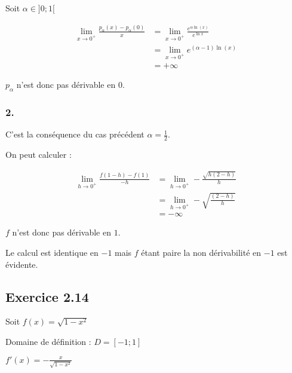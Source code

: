 \documentclass[a4paper,10pt]{report}
\begin{document}
Soit $\alpha \in ]0;1[$

\begin{equation*}
	\begin{split}
		\lim_{x \rightarrow 0^{+}} \frac{p_{\alpha}(x) - p_{\alpha}(0)}{x}
		&= \lim_{x \rightarrow 0^{+}} \frac{e^{\alpha \ln(x)}}{e^{\ln x}} \\
		&= \lim_{x \rightarrow 0^{+}} e^{(\alpha-1) \ln(x)} \\
		&= +\infty
	\end{split}
\end{equation*}

$p_\alpha$ n'est donc pas dérivable en $0$.

\subsubsection*{2.}

C'est la conséquence du cas précédent $\alpha = \frac{1}{2}$.

On peut calculer :

\begin{equation*}
	\begin{split}
		\lim_{h \rightarrow 0^{+}} \frac{f(1-h) - f(1)}{-h}
			&= \lim_{h \rightarrow 0^{+}} -\frac{\sqrt{h(2-h)}}{h} \\
			&= \lim_{h \rightarrow 0^{+}} -\sqrt{\frac{(2-h)}{h}} \\
			&= -\infty
	\end{split}
\end{equation*}

$f$ n'est donc pas dérivable en $1$.

Le calcul est identique en $-1$ mais $f$ étant paire la non dérivabilité en $-1$ est évidente.


\subsection*{Exercice 2.14}

Soit $f(x) = \sqrt{1-x^2}$

Domaine de définition : $D = [-1 ; 1]$

$f'(x) = -\frac{x}{\sqrt{1-x^2}}$

\end{document}
